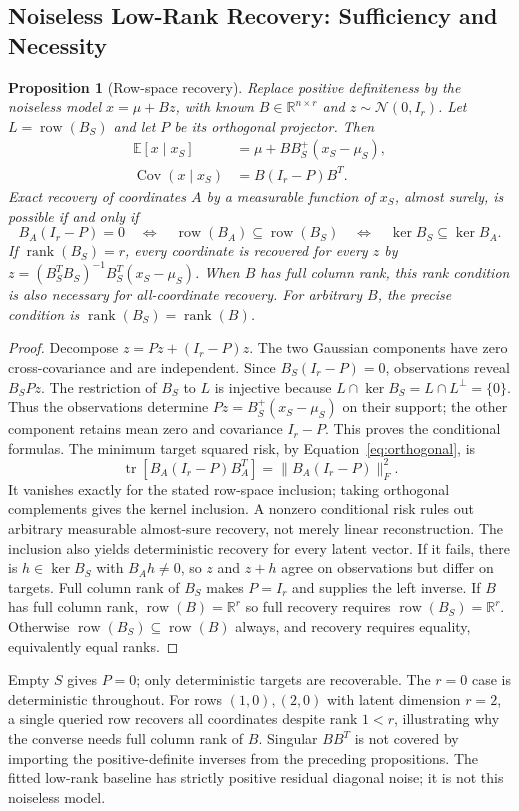 \documentclass{article}
\newtheorem{proposition}{Proposition}
\newcommand{\R}{\mathbb{R}}
\newcommand{\E}{\mathbb{E}}
\newcommand{\tr}{\operatorname{tr}}
\newcommand{\Cov}{\operatorname{Cov}}
\newcommand{\rank}{\operatorname{rank}}
\newcommand{\row}{\operatorname{row}}
\begin{document}
\subsection{Noiseless Low-Rank Recovery: Sufficiency and Necessity}
\begin{proposition}[Row-space recovery]
Replace positive definiteness by the noiseless model $x=\mu+Bz$, with known $B\in\R^{n\times r}$ and $z\sim\mathcal N(0,I_r)$. Let $L=\row(B_S)$ and let $P$ be its orthogonal projector. Then
\begin{align}
\E[x\mid x_S]&=\mu+BB_S^+(x_S-\mu_S),\\
\Cov(x\mid x_S)&=B(I_r-P)B^T.
\end{align}
Exact recovery of coordinates $A$ by a measurable function of $x_S$, almost surely, is possible if and only if
\begin{equation}
B_A(I_r-P)=0\quad\Longleftrightarrow\quad
\row(B_A)\subseteq\row(B_S)\quad\Longleftrightarrow\quad
\ker B_S\subseteq\ker B_A.
\end{equation}
If $\rank(B_S)=r$, every coordinate is recovered for every $z$ by
$z=(B_S^TB_S)^{-1}B_S^T(x_S-\mu_S)$. When $B$ has full column rank, this rank condition is also necessary for all-coordinate recovery. For arbitrary $B$, the precise condition is $\rank(B_S)=\rank(B)$.
\end{proposition}
\begin{proof}
Decompose $z=Pz+(I_r-P)z$. The two Gaussian components have zero cross-covariance and are independent. Since $B_S(I_r-P)=0$, observations reveal $B_SPz$. The restriction of $B_S$ to $L$ is injective because $L\cap\ker B_S=L\cap L^\perp=\{0\}$. Thus the observations determine $Pz=B_S^+(x_S-\mu_S)$ on their support; the other component retains mean zero and covariance $I_r-P$. This proves the conditional formulas. The minimum target squared risk, by Equation~\eqref{eq:orthogonal}, is
\begin{equation}
\tr[B_A(I_r-P)B_A^T]=\|B_A(I_r-P)\|_F^2.
\end{equation}
It vanishes exactly for the stated row-space inclusion; taking orthogonal complements gives the kernel inclusion. A nonzero conditional risk rules out arbitrary measurable almost-sure recovery, not merely linear reconstruction. The inclusion also yields deterministic recovery for every latent vector. If it fails, there is $h\in\ker B_S$ with $B_Ah\ne0$, so $z$ and $z+h$ agree on observations but differ on targets. Full column rank of $B_S$ makes $P=I_r$ and supplies the left inverse. If $B$ has full column rank, $\row(B)=\R^r$ so full recovery requires $\row(B_S)=\R^r$. Otherwise $\row(B_S)\subseteq\row(B)$ always, and recovery requires equality, equivalently equal ranks.
\end{proof}
Empty $S$ gives $P=0$; only deterministic targets are recoverable. The $r=0$ case is deterministic throughout. For rows $(1,0),(2,0)$ with latent dimension $r=2$, a single queried row recovers all coordinates despite rank $1<r$, illustrating why the converse needs full column rank of $B$. Singular $BB^T$ is not covered by importing the positive-definite inverses from the preceding propositions. The fitted low-rank baseline has strictly positive residual diagonal noise; it is not this noiseless model.
\end{document}
